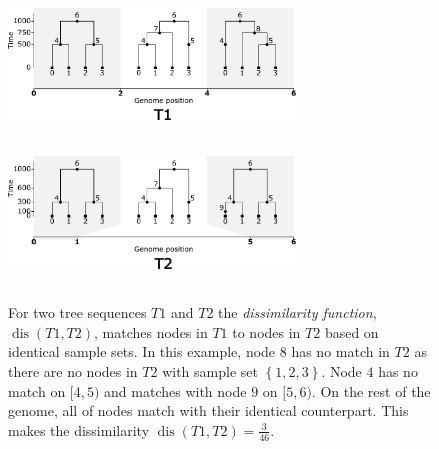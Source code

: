 \documentclass[10pt,twoside,lineno]{gsajnl}
\newcommand{\dis}{\operatorname{dis}}
\begin{document}
\begin{figure}[!ht]
	\begin{center}
\includegraphics[height=1.5in, width=3in]{discrepancy_func_method_t1.pdf}
\includegraphics[height=1.5in, width=3in]{discrepancy_function_method_t2.pdf}
    \caption{
        For two tree sequences $T1$ and $T2$ the \emph{dissimilarity function}, $\dis(T1,T2)$, matches nodes in $T1$ to nodes in $T2$
        based on identical sample sets.
        In this example, node $8$ has no match in $T2$ as there are no nodes in $T2$ with sample set $\left\{1,2,3\right\}$.
        Node $4$ has no match on $[4,5)$ and matches with node $9$ on $[5,6)$. On the rest of the genome, all of nodes match with their identical counterpart.
        This makes the dissimilarity $\dis(T1,T2)=\frac{3}{46}$.
        \label{fig:conceptual_discrepancy}
    }
	\end{center}
\end{figure}
\end{document}
